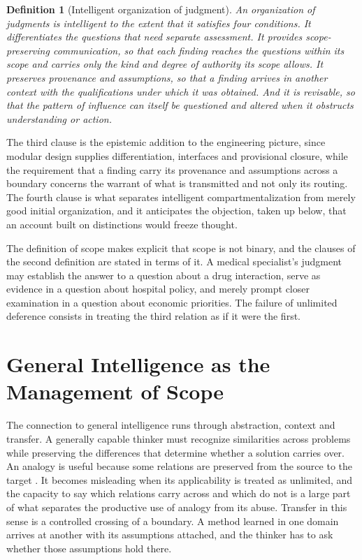 \documentclass[12pt, a4paper]{article}
\newtheorem{definition}{Definition}
\begin{document}
\begin{definition}[Intelligent organization of judgment]
An organization of judgments is \emph{intelligent} to the extent that it satisfies four conditions. It \emph{differentiates} the questions that need separate assessment. It provides \emph{scope-preserving communication}, so that each finding reaches the questions within its scope and carries only the kind and degree of authority its scope allows. It \emph{preserves provenance and assumptions}, so that a finding arrives in another context with the qualifications under which it was obtained. And it is \emph{revisable}, so that the pattern of influence can itself be questioned and altered when it obstructs understanding or action.
\end{definition}

The third clause is the epistemic addition to the engineering picture, since modular design supplies differentiation, interfaces and provisional closure, while the requirement that a finding carry its provenance and assumptions across a boundary concerns the warrant of what is transmitted and not only its routing. The fourth clause is what separates intelligent compartmentalization from merely good initial organization, and it anticipates the objection, taken up below, that an account built on distinctions would freeze thought.

The definition of scope makes explicit that scope is not binary, and the clauses of the second definition are stated in terms of it. A medical specialist's judgment may establish the answer to a question about a drug interaction, serve as evidence in a question about hospital policy, and merely prompt closer examination in a question about economic priorities. The failure of unlimited deference consists in treating the third relation as if it were the first.

\section{General Intelligence as the Management of Scope}

The connection to general intelligence runs through abstraction, context and transfer. A generally capable thinker must recognize similarities across problems while preserving the differences that determine whether a solution carries over. An analogy is useful because some relations are preserved from the source to the target \citep{gentner1983}. It becomes misleading when its applicability is treated as unlimited, and the capacity to say which relations carry across and which do not is a large part of what separates the productive use of analogy from its abuse. Transfer in this sense is a controlled crossing of a boundary. A method learned in one domain arrives at another with its assumptions attached, and the thinker has to ask whether those assumptions hold there.
\end{document}
